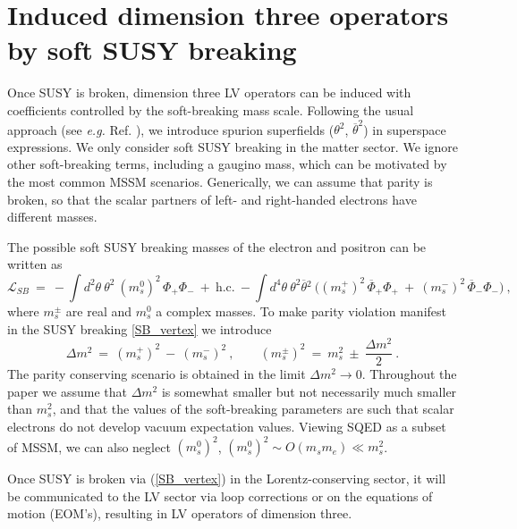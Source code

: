 \documentclass[12pt]{revtex4}
\begin{document}
\section{Induced dimension three operators by soft SUSY breaking}
\label{InducedDim3}


Once SUSY is broken, dimension three LV operators can be induced 
with coefficients controlled by the soft-breaking mass scale. 
Following the usual approach (see {\em e.g.} Ref. \cite{Wess:1992cp}),
we introduce spurion superfields ($\theta^2$, $\overline\theta^2$) in
superspace expressions. We only consider soft SUSY breaking in the
matter sector. We ignore other soft-breaking terms, including a
gaugino mass, which can be motivated by the most common MSSM scenarios.
Generically, we can assume that parity is broken, so that
the scalar partners of left- and right-handed electrons have different masses.


The possible soft SUSY breaking masses of the electron and positron
can be written as 
\begin{equation}
\label{SB_vertex}
  \mathcal{L}_{SB} ~=~  
- \int d^2\theta ~ \theta^2~ 
(m_{s}^0)^2 \, \Phi_+ \Phi_-
~+~ \text{h.c.} 
~- \int d^4\theta ~
\theta^2\overline{\theta}{}^2~ 
\Big( 
(m_s^+)^2\, \overline{\Phi}_+ \Phi_+ 
~+~
(m_s^-)^2\, \overline{\Phi}_- \Phi_-
\Big)  
~, 
\end{equation}
%
where $m_s^\pm$ are real and $m_s^{0}$ a complex masses. 
To make parity violation manifest in the SUSY breaking 
\eqref{SB_vertex} we introduce 
\begin{equation}
\Delta m^2 ~=~ (m_{s}^+)^2 ~ - ~ (m_{s}^-)^2~, 
\qquad
(m_{s}^\pm)^2 ~=~ m_s^2 ~\pm~ \frac{\Delta m^2}2~.
\label{deltam}
\end{equation}
%
The parity conserving scenario is obtained in the limit 
$ \Delta m^2 \to 0 $. Throughout the paper we assume that 
 $ \Delta m^2$ is somewhat smaller but not necessarily much smaller than 
$m_s^2$, and that the values of the soft-breaking parameters are such that 
scalar electrons do not develop vacuum expectation values. 
Viewing SQED as a subset of MSSM, we can also neglect $(m_{s}^0)^2$, $(m_{s}^0)^2
\sim O(m_s m_e)\ll m_s^2$. 

Once SUSY
is broken via (\ref{SB_vertex}) in the Lorentz-conserving sector, it
will be communicated to the LV sector via loop corrections or on the
equations of motion (EOM's), resulting in LV operators of dimension three.  
\end{document}
